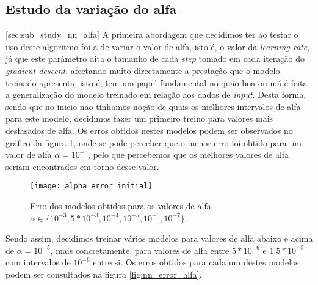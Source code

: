 \subsection{Estudo da variação do alfa}
\ref{sec:sub_study_nn_alfa}
A primeira abordagem que decidimos ter ao testar o uso deste algoritmo foi a de variar o valor de alfa, isto é, o valor da \textit{learning rate}, já que este parâmetro dita o tamanho de cada \textit{step} tomado em cada iteração do \textit{gradient descent}, afectando muito directamente a prestação que o modelo treinado apresenta, isto é, tem um papel fundamental no quão boa ou má é feita a generalização do modelo treinado em relação aos dados de \textit{input}.
Desta forma, sendo que no inicio não tínhamos noção de quais os melhores intervalos de alfa para este modelo, decidimos fazer um primeiro treino para valores mais desfasados de alfa. Os erros obtidos nestes modelos podem ser observados no gráfico da figura \ref{fig:nn_initial_error_alfa}, onde se pode perceber que o menor erro foi obtido para um valor de alfa $\alpha = 10^{-5}$, pelo que percebemos que os melhores valores de alfa seriam encontrados em torno desse valor.

\begin{figure}[!t]
\centering
\texttt{[image: alpha\_error\_initial]}
\caption{Erro dos modelos obtidos para os valores de alfa $\alpha \in \{10^{-3}, 5*10^{-3}, 10^{-4}, 10^{-5}, 10^{-6}, 10^{-7}\}$.}
\label{fig:nn_initial_error_alfa}
\end{figure}
Sendo assim, decidimos treinar vários modelos para valores de alfa abaixo e acima de $\alpha = 10^{-5}$, mais concretamente, para valores de alfa entre $5*10^{-6}$ e $1.5*10^{-5}$ com intervalos de $10^{-6}$ entre si. Os erros  obtidos para cada um destes modelos podem ser consultados na figura \ref{fig:nn_error_alfa}.

